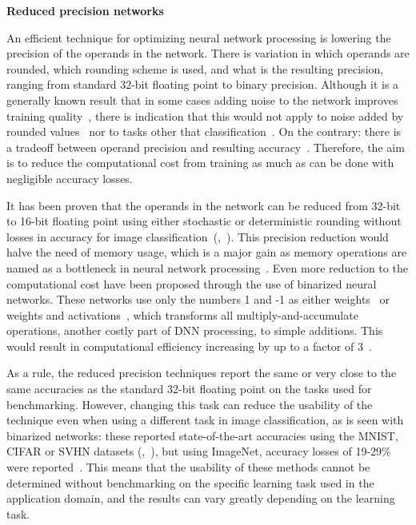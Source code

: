\textbf{Reduced precision networks}

An efficient technique for optimizing neural network processing is lowering the precision of the operands in the network. There is variation in which operands are rounded, which rounding scheme is used, and what is the resulting precision, ranging from standard 32-bit floating point to binary precision. Although it is a generally known result that in some cases adding noise to the network improves training quality~\cite{murrayEnhancedMLPPerformance1994}, there is indication that this would not apply to noise added by rounded values~\cite{murrayEnhancedMLPPerformance1994} nor to tasks other that classification~\cite{anEffectsAddingNoise1996}. On the contrary: there is a tradeoff between operand precision and resulting accuracy~\cite{courbariauxTrainingDeepNeural2015}. Therefore, the aim is to reduce the computational cost from training as much as can be done with negligible accuracy losses.

It has been proven that the operands in the network can be reduced from 32-bit to 16-bit floating point using either stochastic or deterministic rounding without losses in accuracy for image classification~(\cite{pmlr-v37-gupta15},~\cite{micikeviciusMixedPrecisionTraining2018}). This precision reduction would halve the need of memory usage, which is a major gain as memory operations are named as a bottleneck in neural network processing~\cite{szeEfficientProcessingDeep2017}. Even more reduction to the computational cost have been proposed through the use of binarized neural networks. These networks use only the numbers 1 and -1 as either weights~\cite{courbariauxBinaryConnectTrainingDeep2016} or weights and activations~\cite{courbariauxBinarizedNeuralNetworks2016},  which transforms all multiply-and-accumulate operations, another costly part of DNN processing, to simple additions. This would result in computational efficiency increasing by up to a factor of 3~\cite{courbariauxBinaryConnectTrainingDeep2016}.

As a rule, the reduced precision techniques report the same or very close to the same accuracies as the standard 32-bit floating point on the tasks used for benchmarking. However, changing this task can reduce the usability of the technique even when using a different task in image classification, as is seen with binarized networks: these reported state-of-the-art accuracies using the MNIST, CIFAR or SVHN datasets (\cite{courbariauxBinarizedNeuralNetworks2016},~\cite{courbariauxBinaryConnectTrainingDeep2016}), but using ImageNet, accuracy losses of 19-29\% were reported~\cite{rastegariXNORNetImageNetClassification2016}. This means that the usability of these methods cannot be determined without benchmarking on the specific learning task used in the application domain, and the results can vary greatly depending on the learning task.

